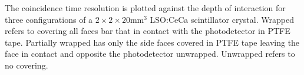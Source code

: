 \label{fig:ctrdoi-20} The coincidence time resolution is plotted against the depth of interaction for three configurations of a $2\times2\times20$mm$^3$ LSO:CeCa scintillator crystal. Wrapped refers to covering all faces bar that in contact with the photodetector in PTFE tape. Partially wrapped has only the side faces covered in PTFE tape leaving the face in contact and opposite the photodetector unwrapped. Unwrapped refers to no covering.